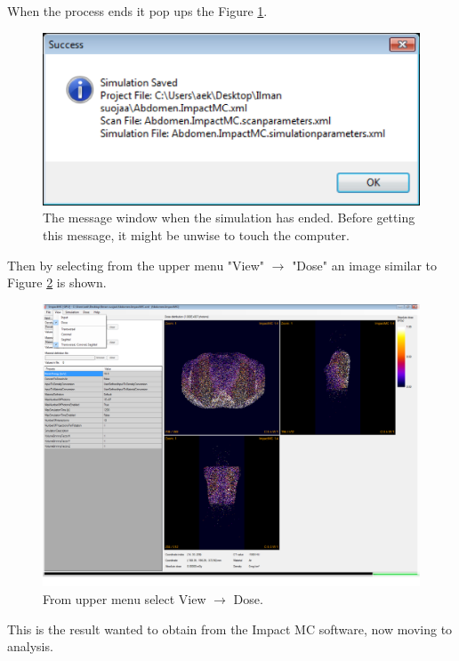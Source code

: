 \documentclass[fleqn,10pt]{SelfArx} %
\begin{document}
When the process ends it pop ups the Figure \ref{fig:guiSuccess}.

\begin{figure}[ht]\centering
\includegraphics[width=\linewidth]{guiSuccess}
\caption{The message window when the simulation has ended. Before getting this message, it might be unwise to touch the computer.}
\label{fig:guiSuccess}
\end{figure}

Then by selecting from the upper menu "View" $\rightarrow$ "Dose" an image similar to Figure \ref{fig:guiDoseCalculated} is shown.

\begin{figure}[ht]\centering
\includegraphics[width=\linewidth]{guiDoseCalculated}
\caption{From upper menu select View $\rightarrow$ Dose.}
\label{fig:guiDoseCalculated}
\end{figure}

This is the result wanted to obtain from the Impact MC software, now moving to analysis.
\end{document}

